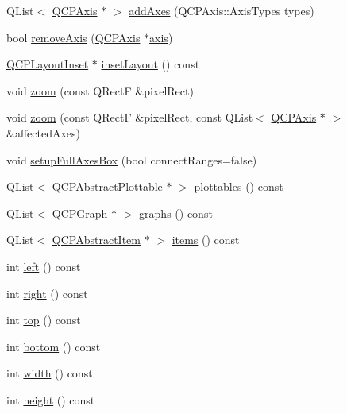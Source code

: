 \begin{DoxyCompactItemize}
\item 
Q\+List$<$ \hyperlink{classQCPAxis}{Q\+C\+P\+Axis} $\ast$ $>$ \hyperlink{classQCPAxisRect_a792e1f3d9cb1591fca135bb0de9b81fc}{add\+Axes} (Q\+C\+P\+Axis\+::\+Axis\+Types types)
\item 
bool \hyperlink{classQCPAxisRect_a03c39cd9704f0d36fb6cf980cdddcbaa}{remove\+Axis} (\hyperlink{classQCPAxis}{Q\+C\+P\+Axis} $\ast$\hyperlink{classQCPAxisRect_a560de44e47a4af0f86c59102a094b1e4}{axis})
\item 
\hyperlink{classQCPLayoutInset}{Q\+C\+P\+Layout\+Inset} $\ast$ \hyperlink{classQCPAxisRect_a4114887c7141b59650b7488f930993e5}{inset\+Layout} () const 
\item 
void \hyperlink{classQCPAxisRect_a5fc8460564e81dcc2a9343dc8bc1fe67}{zoom} (const Q\+RectF \&pixel\+Rect)
\item 
void \hyperlink{classQCPAxisRect_ae481c28b50e10cfbbec59fde45e77367}{zoom} (const Q\+RectF \&pixel\+Rect, const Q\+List$<$ \hyperlink{classQCPAxis}{Q\+C\+P\+Axis} $\ast$ $>$ \&affected\+Axes)
\item 
void \hyperlink{classQCPAxisRect_a5fa906175447b14206954f77fc7f1ef4}{setup\+Full\+Axes\+Box} (bool connect\+Ranges=false)
\item 
Q\+List$<$ \hyperlink{classQCPAbstractPlottable}{Q\+C\+P\+Abstract\+Plottable} $\ast$ $>$ \hyperlink{classQCPAxisRect_a5b0d629c8de5572945eeae79a142296e}{plottables} () const 
\item 
Q\+List$<$ \hyperlink{classQCPGraph}{Q\+C\+P\+Graph} $\ast$ $>$ \hyperlink{classQCPAxisRect_afa4ff90901d9275f670e24b40e3c1b25}{graphs} () const 
\item 
Q\+List$<$ \hyperlink{classQCPAbstractItem}{Q\+C\+P\+Abstract\+Item} $\ast$ $>$ \hyperlink{classQCPAxisRect_a0f17ed539962cfcbaca8ce0b1776c840}{items} () const 
\item 
int \hyperlink{classQCPAxisRect_a55b3ecf72a3a65b053f7651b88db458d}{left} () const 
\item 
int \hyperlink{classQCPAxisRect_a6d0f989fc552aa2b563cf82f8fc81e61}{right} () const 
\item 
int \hyperlink{classQCPAxisRect_ac45aef1eb75cea46b241b6303028a607}{top} () const 
\item 
int \hyperlink{classQCPAxisRect_af2b5982ebe7e6f781b9bf1cc371a60d8}{bottom} () const 
\item 
int \hyperlink{classQCPAxisRect_a45bf5c17f4ca29131b7eb0db06efc259}{width} () const 
\item 
int \hyperlink{classQCPAxisRect_a1c55c4f3bef40cf01b21820316c8469e}{height} () const 

\end{DoxyCompactItemize}
